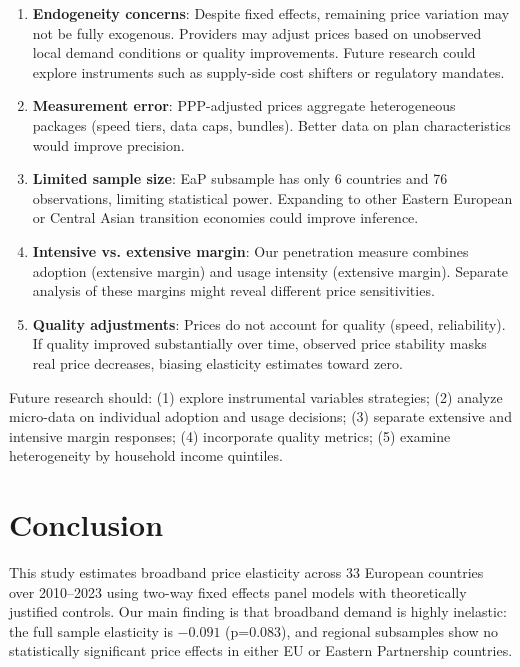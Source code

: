 \documentclass[12pt,review]{elsarticle}
\begin{document}
\begin{enumerate}
\item \textbf{Endogeneity concerns}: Despite fixed effects, remaining price variation may not be fully exogenous. Providers may adjust prices based on unobserved local demand conditions or quality improvements. Future research could explore instruments such as supply-side cost shifters or regulatory mandates.

\item \textbf{Measurement error}: PPP-adjusted prices aggregate heterogeneous packages (speed tiers, data caps, bundles). Better data on plan characteristics would improve precision.

\item \textbf{Limited sample size}: EaP subsample has only 6 countries and 76 observations, limiting statistical power. Expanding to other Eastern European or Central Asian transition economies could improve inference.

\item \textbf{Intensive vs. extensive margin}: Our penetration measure combines adoption (extensive margin) and usage intensity (extensive margin). Separate analysis of these margins might reveal different price sensitivities.

\item \textbf{Quality adjustments}: Prices do not account for quality (speed, reliability). If quality improved substantially over time, observed price stability masks real price decreases, biasing elasticity estimates toward zero.
\end{enumerate}

Future research should: (1) explore instrumental variables strategies; (2) analyze micro-data on individual adoption and usage decisions; (3) separate extensive and intensive margin responses; (4) incorporate quality metrics; (5) examine heterogeneity by household income quintiles.

\section{Conclusion}
\label{sec:conclusion}

This study estimates broadband price elasticity across 33 European countries over 2010--2023 using two-way fixed effects panel models with theoretically justified controls. Our main finding is that broadband demand is highly inelastic: the full sample elasticity is $-0.091$ (p=0.083), and regional subsamples show no statistically significant price effects in either EU or Eastern Partnership countries.
\end{document}
